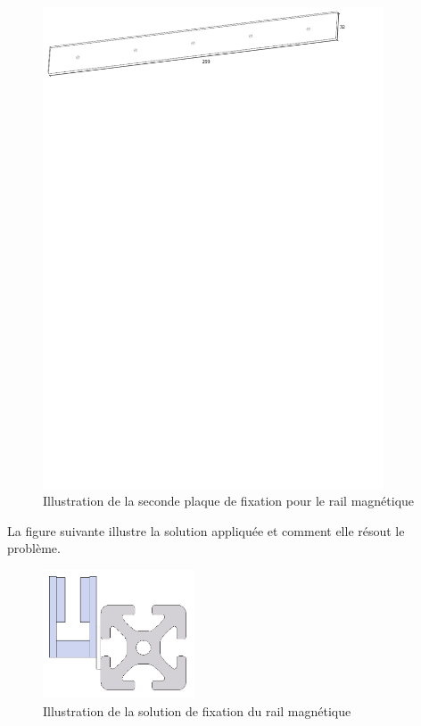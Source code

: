 \begin{figure}[H]
    \centering
    \includegraphics[width = 0.9\textwidth]{assets/figures/PlaqueFixation2.svg}
    \caption{Illustration de la seconde plaque de fixation pour le rail magnétique}
    \label{fig:PlaqueFix2}
\end{figure}

La figure suivante illustre la solution appliquée et comment elle résout le problème.

\begin{figure}[H]
    \centering
    \includegraphics[width = 0.4\textwidth]{assets/figures/FixationRailMagSol.png}
    \caption{Illustration de la solution de fixation du rail magnétique}
    \label{fig:FixRailMagSol}
\end{figure}

